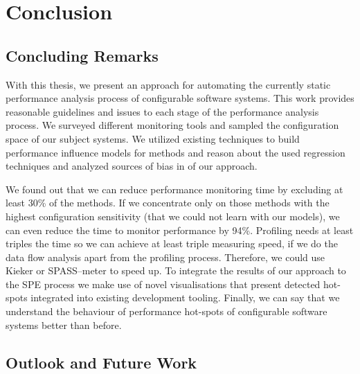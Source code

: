 \chapter{Conclusion}
\label{chap:conlusion}

\section{Concluding Remarks}

With this thesis, we present an approach for automating the currently static performance analysis process of configurable software systems. This work provides reasonable guidelines and issues to each stage of the performance analysis process. We surveyed different monitoring tools and sampled the configuration space of our subject systems. We utilized existing techniques to build performance influence models for methods and reason about the used regression techniques and analyzed sources of bias in of our approach. 

We found out that we can reduce performance monitoring time by excluding at least 30\% of the methods. If we concentrate only on those methods with the highest configuration sensitivity (that we could not learn with our models), we can even reduce the time to monitor performance by 94\%. 
Profiling needs at least triples the time so we can achieve at least triple measuring speed, if we do the data flow analysis apart from the profiling process. Therefore, we could use Kieker or SPASS--meter to speed up.
To integrate the results of our approach to the \ac{SPE} process we make use of novel visualisations that present detected hot-spots integrated into existing development tooling. Finally, we can say that we understand the behaviour of performance hot-spots of configurable software systems better than before.


\section{Outlook and Future Work}



